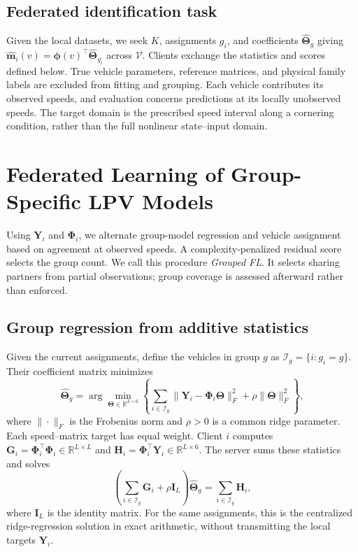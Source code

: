 \documentclass[conference]{IEEEtran}
\newcommand{\R}{\mathbb{R}}
\newcommand{\rev}[1]{\textcolor{revisiongreen}{#1}}
\newcommand{\revred}[1]{\textcolor{revisionred}{#1}}
\newcommand{\bs}[1]{\boldsymbol{#1}}
\newcommand{\method}[1]{\textit{#1}}
\newcommand{\GroupedFL}{\method{Grouped FL}}
\begin{document}
\subsection{\revred{Federated identification task}}
Given \rev{the local datasets}, we seek $K$, assignments $g_i$, and coefficients
\rev{$\widehat{\bs{\Theta}}_g$ giving
$\widehat{\bs{m}}_i(v)=\bs{\phi}(v)^\top\widehat{\bs{\Theta}}_{g_i}$
across $\mathcal V$}. Clients exchange the statistics and scores defined
\rev{below. True vehicle} parameters, reference matrices, and \rev{physical} family
labels are excluded from fitting and grouping. Each \rev{vehicle contributes}
its \rev{observed speeds, and evaluation} concerns \rev{predictions at its locally}
unobserved speeds. \rev{The target domain is} the \rev{prescribed} speed interval along
\rev{a cornering condition, rather than} the \rev{full} nonlinear state--input domain.
\endgroup

\section{Federated \rev{Learning of Group-Specific LPV Models}}
\begingroup
Using $\bs{Y}_i$ and $\bs{\Phi}_i$, we alternate \rev{group-model regression}
and \rev{vehicle assignment based on} agreement at observed speeds.
\rev{A complexity-penalized} residual \rev{score} selects the group count.
\rev{We call this procedure \GroupedFL{}. It selects} sharing partners from
partial observations; group coverage is assessed afterward rather than enforced.

\subsection{\rev{Group regression from additive statistics}}
\rev{Given} the \rev{current assignments, define the} vehicles in group $g$ \rev{as
$\mathcal I_g=\{i:g_i=g\}$. Their coefficient matrix} minimizes
\begingroup\color{revisiongreen}
\begin{equation}
 \widehat{\bs{\Theta}}_g=\arg\min_{\bs{\Theta}\in\R^{L\times6}}
 \left\{\sum_{i\in\mathcal I_g}\|\bs{Y}_i-\bs{\Phi}_i\bs{\Theta}\|_F^2
       +\rho\|\bs{\Theta}\|_F^2\right\},
 \label{eq:group-objective}
\end{equation}
\endgroup
where $\|\cdot\|_F$ is the Frobenius norm and \rev{$\rho>0$ is a common} ridge
\rev{parameter}. Each speed--matrix target has equal weight. Client $i$ computes
$\bs{G}_i=\bs{\Phi}_i^\top\bs{\Phi}_i\in\R^{L\times L}$ and
$\bs{H}_i=\bs{\Phi}_i^\top\bs{Y}_i\in\R^{L\times6}$.
The server sums these statistics and solves
\begingroup\color{revisiongreen}
\begin{equation}
 \left(\sum_{i\in\mathcal I_g}\bs{G}_i+\rho\bs{I}_L\right)
 \widehat{\bs{\Theta}}_g=\sum_{i\in\mathcal I_g}\bs{H}_i,
 \label{eq:fed}
\end{equation}
\endgroup
where $\bs{I}_L$ is the identity matrix. For \rev{the same assignments}, this \rev{is}
the \rev{centralized ridge-regression} solution in exact arithmetic, without
\rev{transmitting the local targets} $\bs{Y}_i$.
\end{document}
